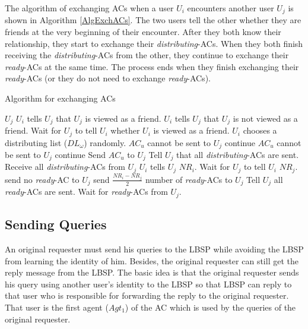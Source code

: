 \documentclass[conference]{IEEEtran}
\begin{document}
The algorithm of exchanging ACs when a user $U_i$ encounters another user $U_j$ is shown in Algorithm \ref{AlgExchACs}. The two users tell the other whether they are friends at the very beginning of their encounter. After they both know their relationship, they start to exchange their \textit{distributing}-ACs. When they both finish receiving the \textit{distributing}-ACs from the other, they continue to exchange their \textit{ready}-ACs at the same time. The process ends when they finish exchanging their \textit{ready}-ACs (or they do not need to exchange \textit{ready}-ACs).

\begin{algorithm} [hbtp]
\caption{Algorithm for exchanging ACs}\label{AlgExchACs}
\begin{algorithmic}[1]
 {$U_j$}
	\State $U_i$ tells $U_j$ that $U_j$ is viewed as a friend.
\Else
	\State $U_i$ tells $U_j$ that $U_j$ is not viewed as a friend.
\EndIf
\State Wait for $U_j$ to tell $U_i$ whether $U_i$ is viewed as a friend.
\State $U_i$ chooses a distributing list (${DL}_{\omega}$) randomly.
		\State ${AC}_u$ cannot be sent to $U_j$
		\State continue
	\EndIf
			\State ${AC}_u$ cannot be sent to $U_j$
			\State continue
		\EndIf
	\EndIf
	\State Send ${AC}_u$ to $U_j$
\EndFor
\State Tell $U_j$ that all \textit{distributing}-ACs are sent.
\State Receive all \textit{distributing}-ACs from $U_j$
	\State $U_i$ tells $U_j$ ${NR}_i$.
\EndIf
{}
	\State Wait for $U_j$ to tell $U_i$ ${NR}_j$.
		\State send no \textit{ready}-AC to $U_j$
	\Else
		\State send $\frac{{NR}_i-{NR}_j}{2}$ number of \textit{ready}-ACs to $U_j$
	\EndIf
	\State Tell $U_j$ all \textit{ready}-ACs are sent.
\EndIf
{}
	\State Wait for \textit{ready}-ACs from $U_j$.
\EndIf 
\EndProcedure

\end{algorithmic}
\end{algorithm}

\subsection{ Sending Queries}

\noindent An original requester must send his queries to the LBSP while avoiding the LBSP from learning the identity of him. Besides, the original requester can still get the reply message from the LBSP. The basic idea is that the original requester sends his query using another user's identity to the LBSP so that LBSP can reply to that user who is responsible for forwarding the reply to the original requester. That user is the first agent ($Agt_1$) of the AC which is used by the queries of the original requester.
\end{document}
